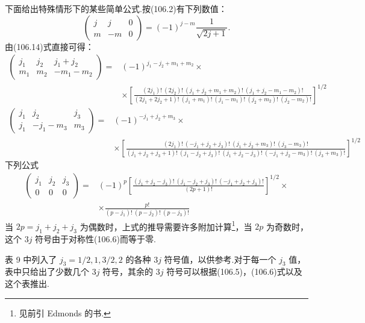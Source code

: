 下面给出特殊情形下的某些简单公式.按(106.2)有下列数值：
\begin{equation}
  \left(\begin{array}{ccc}j&j&0\\m&-m&0\end{array}\right)
  =(-1)^{j-m}\frac{1}{\sqrt{2j+1}}.
\end{equation}
由(106.14)式直接可得：
\begin{equation}
\begin{aligned}
  \left(\begin{array}{ccc}j_1&j_2&j_1+j_2\\m_1&m_2&-m_1-m_2\end{array}\right)
  ={}&(-1)^{j_1-j_2+m_1+m_2}\times\\
  &\times\left[\tfrac{(2j_1)!\ (2j_2)!\ (j_1+j_2+m_1+m_2)!\ (j_1+j_2-m_1-m_2)!}
  {(2j_1+2j_2+1)!\ (j_1+m_1)!\ (j_1-m_1)!\ (j_2+m_2)!\ (j_2-m_2)!}\right]^{1/2}
\end{aligned}
\end{equation}
\begin{equation*}
\begin{aligned}
  \left(\begin{array}{ccc}j_1&j_2&j_3\\j_1&-j_1-m_3&m_3\end{array}\right)
  ={}&(-1)^{-j_1+j_2+m_3}\times\\
  &\times\left[\tfrac{(2j_1)!\ (-j_1+j_2+j_3)!\ (j_1+j_2+m_3)!\ (j_3-m_3)!}
  {(j_1+j_2+j_3+1)!\ (j_1-j_2+j_3)!\ (j_1+j_2-j_3)!\ (-j_1+j_2-m_3)!\ (j_3+m_3)!}\right]^{1/2}
\end{aligned}
\end{equation*}
下列公式
\begin{equation}
\begin{aligned}
  \left(\begin{array}{ccc}j_1&j_2&j_3\\0&0&0\end{array}\right)
  ={}&(-1)^p\left[\frac{(j_1+j_2-j_3)!\ (j_1-j_2+j_3)!\ (-j_1+j_2+j_3)!}{(2p+1)!}\right]^{1/2}\times\\
  &\times\frac{p!}{(p-j_1)!\ (p-j_2)!\ (p-j_3)!}
\end{aligned}
\end{equation}
当 $2p=j_1+j_2+j_3$ 为偶数时，上式的推导需要许多附加计算\footnote{见前引 Edmonds 的书.}，当 $2p$ 为奇数时，这个 $3j$ 符号由于对称性(106.6)而等于零.

表 9 中列入了 $j_3=1/2,1,3/2,2$ 的各种 $3j$ 符号值，以供参考.对于每一个 $j_3$ 值，表中只给出了少数几个 $3j$ 符号，其余的 $3j$ 符号可以根据(106.5)，(106.6)式以及这个表推出.

